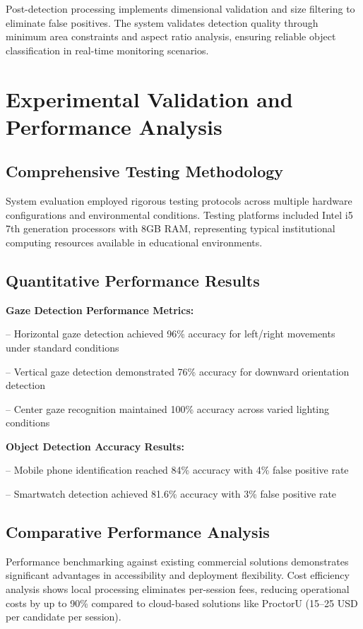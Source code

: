 \documentclass[conference]{IEEEtran}
\begin{document}
Post-detection processing implements dimensional validation and size filtering to eliminate false positives. The system validates detection quality through minimum area constraints and aspect ratio analysis, ensuring reliable object classification in real-time monitoring scenarios.

\section{Experimental Validation and Performance Analysis}

\subsection{Comprehensive Testing Methodology}

System evaluation employed rigorous testing protocols across multiple hardware configurations 
and environmental conditions. Testing platforms included Intel i5 7th generation processors 
with 8GB RAM, representing typical institutional computing resources available in educational 
environments.

\subsection{Quantitative Performance Results}

\textbf{Gaze Detection Performance Metrics:}

-- Horizontal gaze detection achieved 96\% accuracy for left/right movements under 
standard conditions

-- Vertical gaze detection demonstrated 76\% accuracy for downward orientation 
detection

-- Center gaze recognition maintained 100\% accuracy across varied lighting 
conditions

\textbf{Object Detection Accuracy Results:}

-- Mobile phone identification reached 84\% accuracy with 4\% false positive rate

-- Smartwatch detection achieved 81.6\% accuracy with 3\% false positive rate

\subsection{Comparative Performance Analysis}

Performance benchmarking against existing commercial solutions demonstrates significant 
advantages in accessibility and deployment flexibility\cite{proctoru}\cite{proctorio}\cite{respondus}. 
Cost efficiency analysis shows local processing eliminates per-session fees, reducing 
operational costs by up to 90\% compared to cloud-based solutions like ProctorU 
(15--25 USD per candidate per session).
\end{document}
